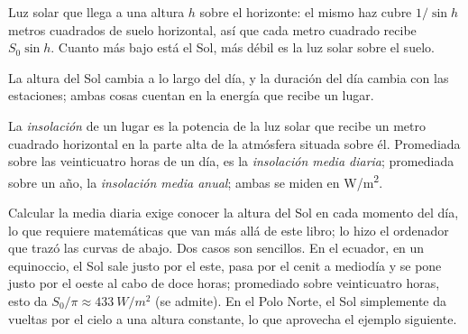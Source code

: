\begin{omfigure}

{\small Luz solar que llega a una altura $h$ sobre el horizonte: el mismo haz
cubre $1/\sin h$ metros cuadrados de suelo horizontal, así que cada metro
cuadrado recibe $S_0 \sin h$. Cuanto más bajo está el Sol, más débil es la
luz solar sobre el suelo.}
\end{omfigure}

La altura del Sol cambia a lo largo del día, y la duración del día cambia
con las estaciones; ambas cosas cuentan en la energía que recibe un lugar.

\begin{definition}[Insolación]\label{def:g10:earth-energy-budget:insolation}
La \emph{insolación} de un lugar es la potencia
de la luz solar que recibe un metro cuadrado horizontal en la parte alta de
la atmósfera situada sobre él. Promediada sobre las veinticuatro horas de un
día, es la \emph{insolación media diaria}; promediada sobre un año, la
\emph{insolación media anual}; ambas se miden en \unit{W/m^2}.
\end{definition}

Calcular la media diaria exige conocer la altura del Sol en cada momento del
día, lo que requiere matemáticas que van más allá de este libro; lo hizo el
ordenador que trazó las curvas de abajo. Dos casos son sencillos. En el
ecuador, en un equinoccio, el Sol sale justo por el este, pasa por el cenit a
mediodía y se pone justo por el oeste al cabo de doce horas; promediado
sobre veinticuatro horas, esto da $S_0/\pi \approx \qty{433}{W/m^2}$ (se
admite). En el Polo Norte, el Sol simplemente da vueltas por el cielo a una
altura constante, lo que aprovecha el ejemplo siguiente.

